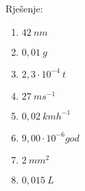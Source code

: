 

Rješenje:
\begin{enumerate}[label=\alph*)]
  \item $42\ nm$ 
  \item $0,01 \ g$
  \item $2,3\cdot 10^{-4}\ t$
  \item $27\ ms^{-1}$
  \item $0,02 \ kmh^{-1} $
  
  \item $9,00\cdot 10^{-6} god $
  \item $2\ mm^2$
  \item $0,015\ L $
\end{enumerate}
